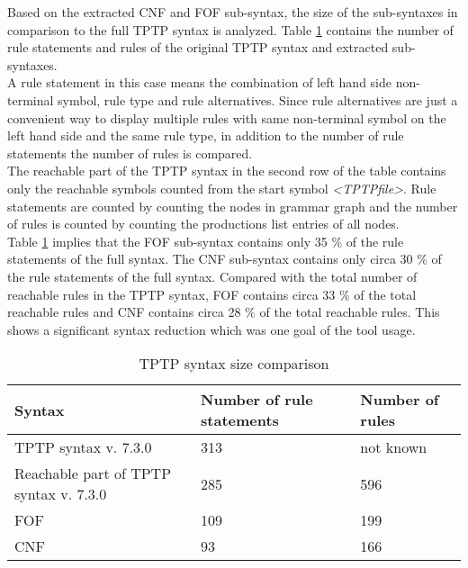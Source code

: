 Based on the extracted CNF and FOF sub-syntax, the size of the sub-syntaxes in comparison to the full TPTP syntax is analyzed.
Table \ref{tbl:EvaluationSyntaxSize} contains the number of rule statements and rules of the original TPTP syntax and extracted sub-syntaxes.\\
A rule statement in this case means the combination of left hand side non-terminal symbol, rule type and rule alternatives.
Since rule alternatives are just a convenient way to display multiple rules with same non-terminal symbol on the left hand side and the same rule type, in addition to the number of rule statements the number of rules is compared.\\
The reachable part of the TPTP syntax in the second row of the table contains only the reachable symbols counted from the start symbol \textit{\textless TPTP\textunderscore file\textgreater}. Rule statements are counted by counting the nodes in grammar graph and the number of rules is counted by counting the productions list entries of all nodes.\\
Table \ref{tbl:EvaluationSyntaxSize} implies that the FOF sub-syntax contains only 35 \% of the rule statements of the full syntax.
The CNF sub-syntax contains only circa 30 \% of the rule statements of the full syntax.
Compared with the total number of reachable rules in the TPTP syntax, FOF contains circa 33 \% of the total reachable rules and CNF contains circa  28 \% of the total reachable rules.
This shows a significant syntax reduction which was one goal of the tool usage.

\begin{table}[H]
\centering
\renewcommand{\arraystretch}{1.5}
\caption{TPTP syntax size comparison}
\begin{adjustbox}{width=1\textwidth, center=\textwidth}
\begin{tabular}{lll}
\textbf{Syntax} & \textbf{Number of rule statements} & \textbf{Number of rules}\\\hline
TPTP syntax v. 7.3.0 & 313 & not known\\
Reachable part of TPTP syntax v. 7.3.0 & 285 & 596\\
FOF & 109 & 199\\
CNF & 93 & 166\\
\end{tabular}
\end{adjustbox}
\label{tbl:EvaluationSyntaxSize}
\end{table}

